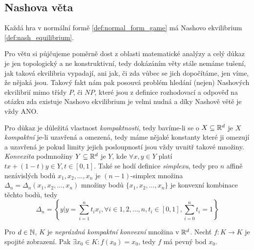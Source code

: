 \subsection{Nashova věta}
\begin{theorem}
\label{thm:nash_theorem}
Každá hra v normální formě \ref{def:normal_form_game} má Nashovo ekvilibrium \ref{def:nash_equilibrium}.
\end{theorem}
Pro větu si půjčujeme poměrně dost z oblasti matematické analýzy a celý důkaz je jen topologický a ne konstruktivní, tedy dokázáním věty stále nemáme tušení, jak taková ekvilibria vypadají, ani jak, či zda vůbec se jich dopočítáme, jen víme, že nějaká jsou. 
Takový fakt nám pak posouvá problém hledání (nejen) Nashových ekvilibrií mimo třídy $P$, či $NP$, které jsou z definice rozhodovací a odpověď na otázku zda existuje Nashovo ekvilibrium je velmi nudná a díky Nashově větě je vždy ANO. 

Pro důkaz je důležitá vlastnost \textit{kompaktnosti}, tedy bavíme-li se o $X \subseteq \mathbb{R}^d$ je $X$ \textit{kompaktní} je-li uzavřená a omezená, tedy máme nějaké konstanty které ji omezují a uzavřená je pokud limity jejich posloupností jsou vždy uvnitř takové množiny. 
\textit{Konvexita} podmnožiny $Y \subseteq \mathbb{R}^d$ je $Y$, kde $\forall x,y \in Y$ platí $tx + (1-t)y \in Y, t \in [0,1]$. 
Také se hodí definice \textit{simplexu}, tedy pro $n$ affině nezávislých bodů $x_1, x_2, \dots, x_n$ je $(n-1)$-simplex množina $\Delta_n = \Delta_n (x_1, x_2, \dots, x_n)$ množiny bodů $\{x_1, x_2, \dots, x_n\}$ je konvexní kombinace těchto bodů, tedy
\[
    \Delta_n = \left\{ y | y = \sum_{i = 1}^n t_ix_i, \forall i\in {1,2,\dots,n}, t_i \in [0,1], \sum^n_{i=0} t_i = 1\right\}
\]

\begin{theorem}
\label{thm:brouwer_theorem}
Pro $d \in \mathbb{N}$, $K$ je \textit{neprázdná kompaktní konvexní} množina v $\mathbb{R}^d$. Nechť $f: K \rightarrow K$ je spojité zobrazení. Pak $\exists x_0 \in K: f(x_0) = x_0$, tedy $f$ má pevný bod $x_0$. 
\end{theorem}

